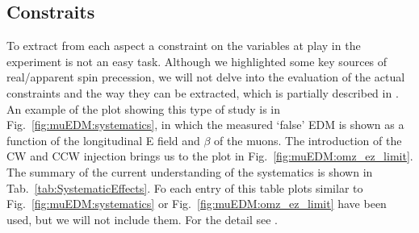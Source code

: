 \begin{refsection}
    \subsection{Constraits} 
        To extract from each aspect a constraint on the variables at play in the experiment is not an easy task.
        Although we highlighted some key sources of real/apparent spin precession, we will not delve into the evaluation of the actual constraints and the way they can be extracted, which is partially described in \cite{chavdar:2023}.
        An example of the plot showing this type of study is in Fig.~\ref{fig:muEDM:systematics}, in which the measured `false' EDM is shown as a function of the longitudinal E field and $\beta$ of the muons.
        The introduction of the CW and CCW injection brings us to the plot in Fig.~\ref{fig:muEDM:omz_ez_limit}.
        The summary of the current understanding of the systematics is shown in Tab.~\ref{tab:SystematicEffects}.
        Fo each entry of this table plots similar to Fig.~\ref{fig:muEDM:systematics} or Fig.~\ref{fig:muEDM:omz_ez_limit} have been used, but we will not include them.
        For the detail see \cite{chavdar:2023}.


\end{refsection}
